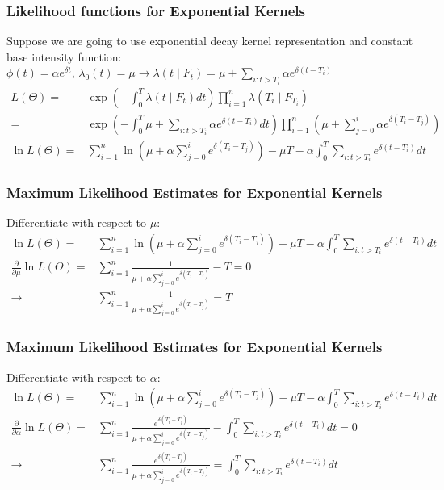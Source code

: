 \documentclass{beamer}
\begin{document}
\begin{frame}
\frametitle{Likelihood functions for Exponential Kernels}
Suppose we are going to use exponential decay kernel representation and constant base intensity function:\\
$\phi(t) = \alpha e^{\delta t}$, $\lambda_0(t) = \mu \to \lambda(t \mid F_{t}) = \mu + \sum_{i: t>T_i} \alpha e^{\delta (t - T_{i})}$
\begin{equation*}
\begin{split}
L(\Theta) = &\exp(-\int_{0}^{T} \lambda(t \mid F_t) dt) \prod_{i=1}^n \lambda(T_i \mid F_{T_{i}})\\
= &\exp(-\int_{0}^{T}  \mu + \sum_{i: t>T_i} \alpha e^{\delta (t - T_i)} dt) \prod_{i=1}^n (\mu + \sum_{j=0}^i \alpha e^{\delta (T_i - T_j)})\\[5mm]
\ln L(\Theta) = & \sum_{i=1}^n \ln (\mu + \alpha \sum_{j=0}^i  e^{\delta (T_i - T_j)}) - \mu T - \alpha \int_{0}^{T}  \sum_{i: t>T_i} e^{\delta (t - T_i)} dt 
\end{split}
\end{equation*}
\end{frame}

\begin{frame}
\frametitle{Maximum Likelihood Estimates for Exponential Kernels}
Differentiate with respect to $\mu$:
\begin{equation*}
\begin{split}
\ln L(\Theta) = & \sum_{i=1}^n \ln (\mu + \alpha \sum_{j=0}^i  e^{\delta (T_i - T_j)}) - \mu T - \alpha \int_{0}^{T}  \sum_{i: t>T_i} e^{\delta (t - T_i)} dt \\
\frac{\partial}{\partial \mu} \ln L(\Theta) =& \sum_{i=1}^n \frac{1}{\mu + \alpha \sum_{j=0}^i e^{\delta (T_i - T_j)}} - T = 0\\
\to &\sum_{i=1}^n \frac{1}{\mu + \alpha \sum_{j=0}^i e^{\delta (T_i - T_j)}} = T
\end{split}
\end{equation*}
\end{frame}

\begin{frame}
\frametitle{Maximum Likelihood Estimates for Exponential Kernels}
Differentiate with respect to $\alpha$:
\begin{equation*}
\begin{split}
\ln L(\Theta) = & \sum_{i=1}^n \ln (\mu + \alpha \sum_{j=0}^i  e^{\delta (T_i - T_j)}) - \mu T - \alpha \int_{0}^{T}  \sum_{i: t>T_i} e^{\delta (t - T_i)} dt \\
\frac{\partial}{\partial \alpha} \ln L(\Theta) =& \sum_{i=1}^n \frac{e^{\delta (T_i - T_j)}}{\mu + \alpha \sum_{j=0}^i e^{\delta (T_i - T_j)}} - \int_{0}^{T}  \sum_{i: t>T_i} e^{\delta (t - T_i)} dt= 0\\
\to& \sum_{i=1}^n \frac{e^{\delta (T_i - T_j)}}{\mu + \alpha \sum_{j=0}^i e^{\delta (T_i - T_j)}} = \int_{0}^{T}  \sum_{i: t>T_i} e^{\delta (t - T_i)} dt
\end{split}
\end{equation*}
\end{frame}
\end{document}
